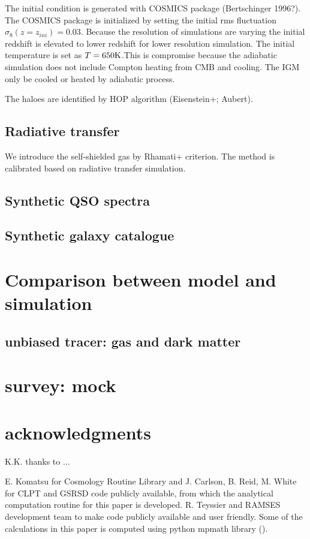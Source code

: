 \documentclass[useAMS,usenatbib,twocolumn]{mn2e}
\begin{document}
The initial condition is generated with COSMICS package (Bertschinger 1996?). 
The COSMICS package is initialized by setting the initial rms fluctuation 
$\sigma_8(z=z_{ini})=0.03$. Because the resolution of simulations are varying 
the initial redshift is elevated to lower redshift for lower resolution 
simulation. The initial temperature is set as $T=650\rm{K}$.This is compromise 
because the adiabatic simulation does not include Compton heating from CMB and 
cooling. The IGM only be cooled or heated by adiabatic process.

The haloes are identified by HOP algorithm (Eisenstein+; Aubert).

\subsection{Radiative transfer}
We introduce the self-shielded gas by Rhamati+ criterion. The method
is calibrated based on radiative transfer simulation.

\subsection{Synthetic QSO spectra}

\subsection{Synthetic galaxy catalogue}

\section{Comparison between model and simulation}
\subsection{unbiased tracer: gas and dark matter}


\section{survey: mock}

\bigskip
\section*{acknowledgments}

K.K. thanks to ...

E. Komatsu for Cosmology Routine Library and J. Carlson, B. Reid, M. White
for CLPT and GSRSD code publicly available, from which the analytical
computation routine for this paper is developed.
R. Teyssier and RAMSES development team to make code publicly available
and user friendly.
Some of the calculations in this paper is computed using 
python mpmath library (\citealt{mpmath}).
\end{document}
